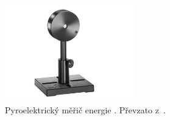 \begin{figure}[htp]
	\centering
	\includegraphics[width=0.5\textwidth]{img/ophir-pe9esc}
	\caption{Pyroelektrický měřič energie .
		Převzato z~\cite{pe9esc-datasheet}.}
	\label{fig:instruments-powermeter}
\end{figure}
